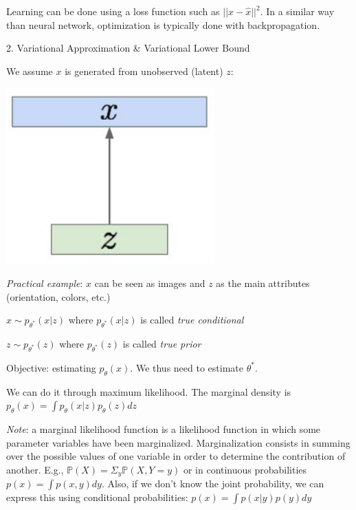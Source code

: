 Learning can be done using a loss function such as $||x - \widehat{x}||^2$. In a similar way than neural network, optimization is typically done with backpropagation.

\vspace{5mm}

2. Variational Approximation \& Variational Lower Bound

\vspace{5mm}

We assume $x$ is generated from unobserved (latent) $z$:

\begin{center}
\includegraphics[scale=0.3]{decoder.png}
\end{center}

\vspace{5mm}

\textit{Practical example}: $x$ can be seen as images and $z$ as the main attributes (orientation, colors, etc.)

\vspace{5mm}

$x \sim p_{\theta^*}(x | z)$ where $p_{\theta^*}(x | z)$ is called \textit{true conditional}

$z \sim p_{\theta^*}(z)$ where $p_{\theta^*}(z)$ is called \textit{true prior}

\vspace{5mm}

Objective: estimating $p_{\theta}(x)$. We thus need to estimate $\theta^*$.

\vspace{5mm}

We can do it through maximum likelihood. The marginal density is $p_{\theta}(x) = \int p_{\theta}(x|z) p_{\theta}(z) dz$

\vspace{5mm}

\textit{Note}: a marginal likelihood function is a likelihood function in which some parameter variables have been marginalized. Marginalization consists in summing over the possible values of one variable in order to determine the contribution of another. E.g., $\mathbb{P}(X)=\Sigma_y \mathbb{P}(X, Y=y)$ or in continuous probabilities $p(x)=\int p(x, y) dy$. Also, if we don't know the joint probability, we can express this using conditional probabilities: $p(x)=\int p(x | y) p(y) dy$

